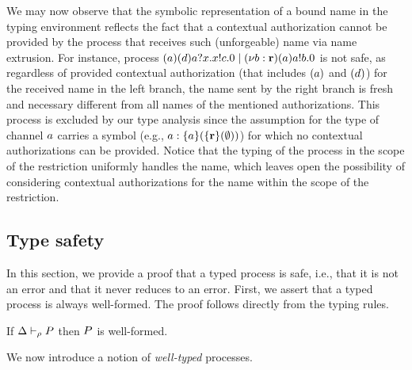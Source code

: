 {
We may now observe that the symbolic representation of a bound name in the typing environment reflects the fact that a contextual authorization cannot be provided by the process that receives such (unforgeable) name via name extrusion. 
For instance, process $(a)(d)a?x.x!c.0 \;|\; (\nu b: {\mathbf{r}})(a)a!b.0$ is not safe, as regardless of provided contextual authorization (that includes $(a)$ and $(d)$) for the received name in the left branch, the name sent by the right branch is fresh and necessary different from all names of the mentioned authorizations.  This process is excluded by our type analysis since the assumption for the type of channel $a$ carries a symbol (e.g., $a: \{a\}(\{{\mathbf{r}}\}(\emptyset))$) for which no contextual authorizations can be provided. Notice that the typing of the process in the scope of the restriction uniformly handles the name, which leaves open the possibility of considering contextual authorizations for the name within the scope of the restriction.
}

\subsection{Type safety}\label{sec:results_types}
In this section, we provide a proof that a typed process is safe, i.e., that it is not an error and that it never reduces to an error. First, we assert that a typed process is always well-formed.
The proof follows directly from the typing rules.

\begin{proposition}
If $\Delta\vdash_\rho P$ then $P$ is well-formed.
\end{proposition}

We now introduce a notion of \emph{well-typed} processes.

